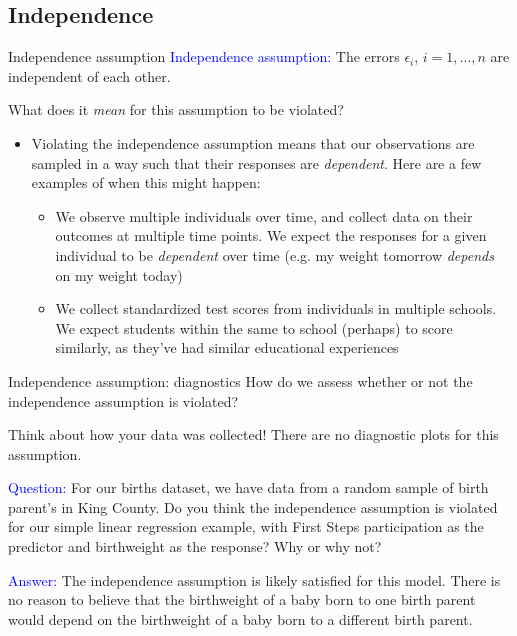 \documentclass[10pt,t]{beamer}
\begin{document}

\subsection{Independence}

\begin{frame}{Independence assumption}
\textcolor{blue}{Independence assumption:} The errors $\epsilon_i$, $i = 1, \dots, n$ are independent of each other.

\vspace{0.3cm}

What does it \textit{mean} for this assumption to be violated?

\vspace{0.3cm}

\begin{itemize}
	\item[] Violating the independence assumption means that our observations are sampled in a way such that their responses are \textit{dependent}. Here are a few examples of when this might happen:
	\begin{itemize}
		\item We observe multiple individuals over time, and collect data on their outcomes at multiple time points. We expect the responses for a given individual to be \textit{dependent} over time (e.g. my weight tomorrow \textit{depends} on my weight today)
		\item We collect standardized test scores from individuals in multiple schools. We expect students within the same to school (perhaps) to score similarly, as they've had similar educational experiences
	\end{itemize}
\end{itemize}
\end{frame}

\begin{frame}{Independence assumption: diagnostics}
How do we assess whether or not the independence assumption is violated?

\vspace{0.3cm}

Think about how your data was collected! There are no diagnostic plots for this assumption.

\vspace{0.3cm}

\textcolor{blue}{Question:} For our births dataset, we have data from a random sample of birth parent's in King County. Do you think the independence assumption is violated for our simple linear regression example, with First Steps participation as the predictor and birthweight as the response? Why or why not? \pause

\vspace{0.3cm}

\textcolor{blue}{Answer:} The independence assumption is likely satisfied for this model. There is no reason to believe that the birthweight of a baby born to one birth parent would depend on the birthweight of a baby born to a different birth parent.

\end{frame}
\end{document}
